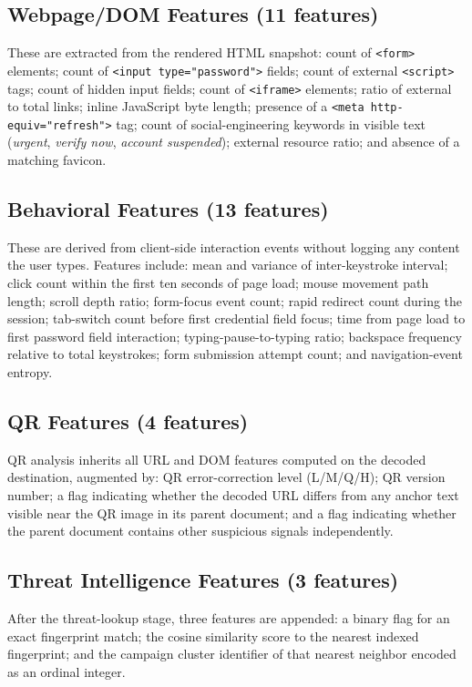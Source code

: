 \documentclass[conference]{IEEEtran}
\begin{document}
\subsection{Webpage/DOM Features (11 features)}
These are extracted from the rendered HTML snapshot: count of \texttt{<form>} elements;
count of \texttt{<input type="password">} fields; count of external \texttt{<script>} tags;
count of hidden input fields; count of \texttt{<iframe>} elements; ratio of external to total
links; inline JavaScript byte length; presence of a \texttt{<meta http-equiv="refresh">} tag;
count of social-engineering keywords in visible text (\textit{urgent}, \textit{verify now},
\textit{account suspended}); external resource ratio; and absence of a matching favicon.

\subsection{Behavioral Features (13 features)}
These are derived from client-side interaction events without logging any content the user types.
Features include: mean and variance of inter-keystroke interval; click count within the first
ten seconds of page load; mouse movement path length; scroll depth ratio; form-focus event count;
rapid redirect count during the session; tab-switch count before first credential field focus;
time from page load to first password field interaction; typing-pause-to-typing ratio; backspace
frequency relative to total keystrokes; form submission attempt count; and navigation-event
entropy.

\subsection{QR Features (4 features)}
QR analysis inherits all URL and DOM features computed on the decoded destination, augmented by:
QR error-correction level (L/M/Q/H); QR version number; a flag indicating whether the decoded
URL differs from any anchor text visible near the QR image in its parent document; and a flag
indicating whether the parent document contains other suspicious signals independently.

\subsection{Threat Intelligence Features (3 features)}
After the threat-lookup stage, three features are appended: a binary flag for an exact
fingerprint match; the cosine similarity score to the nearest indexed fingerprint; and the
campaign cluster identifier of that nearest neighbor encoded as an ordinal integer.
\end{document}
